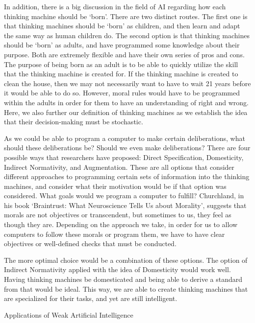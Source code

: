 \documentclass[11pt]{article}
\begin{document}
\par In addition, there is a big discussion in the field of AI regarding how each thinking machine should be `born'. There are two distinct routes. The first one is that thinking machines should be `born' as children, and then learn and adapt the same way as human children do. The second option is that thinking machines should be `born' as adults, and have programmed some knowledge about their purpose. Both are extremely flexible and have their own series of pros and cons. The purpose of being born as an adult is to be able to quickly utilize the skill that the thinking machine is created for. If the thinking machine is created to clean the house, then we may not  necessarily want to have to wait 21 years before it would be able to do so. However, moral rules would have to be programmed within the adults in order for them to have an understanding of right and wrong. Here, we also further our definition of thinking machines as we establish the idea that their decision-making must be stochastic.

\par As we could be able to program a computer to make certain deliberations, what should these deliberations be? Should we even make deliberations? There are four possible ways that researchers have proposed: Direct Specification, Domesticity, Indirect Normativity, and Augmentation. These are all options that consider different approaches to programming certain sets of information into the thinking machines, and consider what their motivation would be if that option was considered. What goals would we program a computer to fulfill? Churchland, in his book ‘Braintrust: What Neuroscience Tells Us about Morality', suggests that morals are not objectives or transcendent, but sometimes to us, they feel as though they are. Depending on the approach we take, in order for us to allow computers to follow these morals or program them, we have to have clear objectives or well-defined checks that must be conducted.

\par The more optimal choice would be a combination of these options. The option of Indirect Normativity applied with the idea of Domesticity would work well. Having thinking machines be domesticated and being able to derive a standard from that would be ideal. This way, we are able to create thinking machines that are specialized for their tasks, and yet are still intelligent.

\begin{center}
	{\large Applications of Weak Artificial Intelligence\par}
\end{center}
\end{document}
